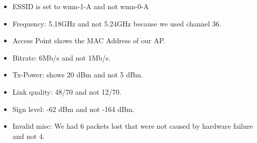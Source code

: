 \begin {itemize}
\item ESSID is set to wmn-1-A and not wmn-0-A
\item Frequency: 5.18GHz and not 5.24GHz because we used channel 36.
\item Access Point shows the MAC Address of our AP.
\item Bitrate: 6Mb/s and not 1Mb/s.
\item Tx-Power: shows 20 dBm and not 5 dBm.
\item Link quality: 48/70 and not 12/70.
\item Sign level: -62 dBm and not -164 dBm.
\item Invalid misc: We had 6 packets lost that were not caused by hardware failure and not 4.
\end{itemize}
